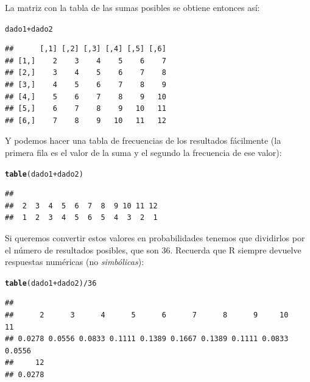 \documentclass[10pt,a4paper]{article}\usepackage[]{graphicx}\usepackage[]{color}
\makeatletter
\newcommand{\hlnum}[1]{\textcolor[rgb]{0.686,0.059,0.569}{#1}}%
\newcommand{\hlopt}[1]{\textcolor[rgb]{0,0,0}{#1}}%
\newcommand{\hlstd}[1]{\textcolor[rgb]{0.345,0.345,0.345}{#1}}%
\newcommand{\hlkwd}[1]{\textcolor[rgb]{0.737,0.353,0.396}{\textbf{#1}}}%
\newenvironment{kframe}{%
 \def\at@end@of@kframe{}%
 \ifinner\ifhmode%
  \def\at@end@of@kframe{\end{minipage}}%
  \begin{minipage}{\columnwidth}%
 \fi\fi%
 \def\FrameCommand##1{\hskip\@totalleftmargin \hskip-\fboxsep
 \colorbox{shadecolor}{##1}\hskip-\fboxsep
     \hskip-\linewidth \hskip-\@totalleftmargin \hskip\columnwidth}%
 \MakeFramed {\advance\hsize-\width
   \@totalleftmargin\z@ \linewidth\hsize
   \@setminipage}}%
 {\par\unskip\endMakeFramed%
 \at@end@of@kframe}
\newenvironment{knitrout}{}{} %
\makeatother
\begin{document}
La matriz con la tabla de las sumas posibles se obtiene entonces así:
\begin{knitrout}
\color{fgcolor}\begin{kframe}
\begin{alltt}
\hlstd{dado1} \hlopt{+} \hlstd{dado2}
\end{alltt}
\begin{verbatim}
##      [,1] [,2] [,3] [,4] [,5] [,6]
## [1,]    2    3    4    5    6    7
## [2,]    3    4    5    6    7    8
## [3,]    4    5    6    7    8    9
## [4,]    5    6    7    8    9   10
## [5,]    6    7    8    9   10   11
## [6,]    7    8    9   10   11   12
\end{verbatim}
\end{kframe}
\end{knitrout}
Y podemos hacer una tabla de frecuencias de los resultados fácilmente (la primera fila es el valor de la suma y el segundo la frecuencia de ese valor):
\begin{knitrout}
\color{fgcolor}\begin{kframe}
\begin{alltt}
\hlkwd{table}\hlstd{(dado1} \hlopt{+} \hlstd{dado2)}
\end{alltt}
\begin{verbatim}
## 
##  2  3  4  5  6  7  8  9 10 11 12 
##  1  2  3  4  5  6  5  4  3  2  1
\end{verbatim}
\end{kframe}
\end{knitrout}
Si queremos convertir estos valores en probabilidades tenemos que dividirlos por el número de resultados posibles, que son $36$. Recuerda que R siempre devuelve respuestas numéricas (no {\em simbólicas}):
\begin{knitrout}
\color{fgcolor}\begin{kframe}
\begin{alltt}
\hlkwd{table}\hlstd{(dado1} \hlopt{+} \hlstd{dado2)} \hlopt{/} \hlnum{36}
\end{alltt}
\begin{verbatim}
## 
##      2      3      4      5      6      7      8      9     10     11 
## 0.0278 0.0556 0.0833 0.1111 0.1389 0.1667 0.1389 0.1111 0.0833 0.0556 
##     12 
## 0.0278
\end{verbatim}
\end{kframe}
\end{knitrout}
\end{document}
